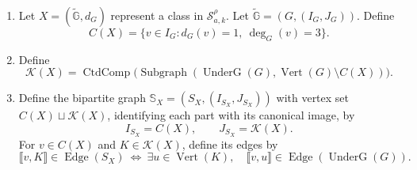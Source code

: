 \begin{definition}
\begin{enumerate}[font=\itshape]
\item\label{d:connector-set} Let $X=(\widetilde{\mathbb G},d_G)$ represent a class in $\mathcal S_{a,k}^\rho$.
Let $\widetilde{\mathbb G}=(G,(I_G,J_G))$.
Define
\[
 C(X)=\{v\in I_G:d_G(v)=1,\ \deg_G(v)=3\}.
\]
\item\label{d:deleted-components} Define
\[
 \mathcal K(X)=\operatorname{CtdComp}\bigl(\operatorname{Subgraph}(\operatorname{UnderG}(G),\operatorname{Vert}(G)\setminus C(X))\bigr).
\]
\item\label{d:recovered-skeleton} Define the bipartite graph $\mathbb S_X=(S_X,(I_{S_X},J_{S_X}))$ with vertex set $C(X)\sqcup\mathcal K(X)$, identifying each part with its canonical image, by
\[
 I_{S_X}=C(X),\qquad
 J_{S_X}=\mathcal K(X).
\]
For $v\in C(X)$ and $K\in\mathcal K(X)$, define its edges by
\[
 \llbracket v,K\rrbracket\in\operatorname{Edge}(S_X)
 \ \Longleftrightarrow\
 \exists u\in\operatorname{Vert}(K),\quad
 \llbracket v,u\rrbracket\in\operatorname{Edge}(\operatorname{UnderG}(G)).
\]
\end{enumerate}
\end{definition}

